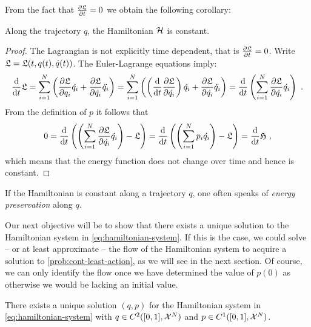 From the fact that $\frac{\partial \mathfrak{L}}{\partial t} = 0$ we obtain the following corollary:
\begin{corollary}
	\label{cor:energy-preservation}
	Along the trajectory $q$, the Hamiltonian $\mathcal{H}$ is constant.
\end{corollary}
\begin{proof}
	The Lagrangian is not explicitly time dependent, that is $\frac{\partial \mathfrak{L}}{\partial t} = 0$.
	Write $\mathfrak{L} = \mathfrak{L}(t, q(t), \dot{q}(t))$.
	The Euler-Lagrange equations imply:
	\begin{equation}
		\frac{\mathrm{d}}{\mathrm{d} t} \mathfrak{L} = \sum_{i=1}^{N}\left(\frac{\partial \mathfrak{L}}{\partial q_i} \dot{q_i} + \frac{\partial \mathfrak{L}}{\partial \dot{q_i}} \ddot{q_i} \right )
		=\sum_{i=1}^{N}\left( \left( \frac{\mathrm{d}}{\mathrm{d} t} \frac{\partial \mathfrak{L}}{\partial \dot{q_i}} 
		\right)\dot{q_i}+ \frac{\partial \mathfrak{L}}{\partial \dot{q_i}} \ddot{q_i}\right )
		= \frac{\mathrm{d}}{\mathrm{d} t} \left(\sum_{i=1}^{N} \frac{\partial \mathfrak{L}}{\partial \dot{q_i}} \dot{q_i}\right) \ .
	\end{equation}
	From the definition of $p$ it follows that
	\begin{equation}
		0 = \frac{\mathrm{d}}{\mathrm{d} t} \left( \left(\sum_{i=1}^{N} \frac{\partial \mathfrak{L}}{\partial \dot{q_i}} \dot{q_i} \right) -  \mathfrak{L} \right) 
		= \frac{\mathrm{d}}{\mathrm{d} t} \left( \left(\sum_{i=1}^{N} p_i \dot{q_i} \right ) - \mathfrak{L} \right)
		= \frac{\mathrm{d}}{\mathrm{d} t} \mathfrak{H} \ ,
	\end{equation}
	which means that the energy function does not change over time and hence is constant.
\end{proof}
If the Hamiltonian is constant along a trajectory $q$, one often speaks of \emph{energy preservation} along $q$.

Our next objective will be to show that there exists a unique solution to the Hamiltonian system in \cref{eq:hamiltonian-system}.
If this is the case, we could solve -- or at least approximate -- the flow of the Hamiltonian system to acquire a solution to \cref{prob:cont-least-action}, as we will see in the next section.
Of course, we can only identify the flow once we have determined the value of $p(0)$ as otherwise we would be lacking an initial value.

\begin{theorem}
	\label{theo:hamiltonian-system-solution}
	There exists a unique solution $(q, p)$ for the Hamiltonian system in \cref{eq:hamiltonian-system} with $q \in C^2([0, 1], \mathcal{X}^N)$ and $p \in C^1([0, 1], \mathcal{X}^N)$.
\end{theorem}


